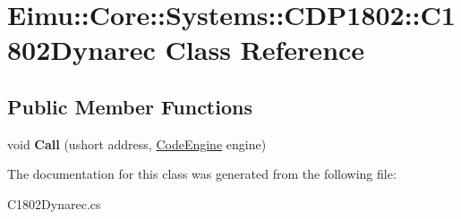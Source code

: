 \hypertarget{class_eimu_1_1_core_1_1_systems_1_1_c_d_p1802_1_1_c1802_dynarec}{
\section{Eimu::Core::Systems::CDP1802::C1802Dynarec Class Reference}
\label{class_eimu_1_1_core_1_1_systems_1_1_c_d_p1802_1_1_c1802_dynarec}
}
\subsection*{Public Member Functions}
\begin{DoxyCompactItemize}
\item 
\hypertarget{class_eimu_1_1_core_1_1_systems_1_1_c_d_p1802_1_1_c1802_dynarec_ab5ec26dc64b5205a7337533541c06a52}{
void {\bfseries Call} (ushort address, \hyperlink{class_eimu_1_1_core_1_1_systems_1_1_s_chip8_1_1_code_engine}{CodeEngine} engine)}
\label{class_eimu_1_1_core_1_1_systems_1_1_c_d_p1802_1_1_c1802_dynarec_ab5ec26dc64b5205a7337533541c06a52}

\end{DoxyCompactItemize}


The documentation for this class was generated from the following file:\begin{DoxyCompactItemize}
\item 
C1802Dynarec.cs\end{DoxyCompactItemize}
